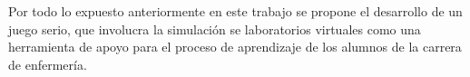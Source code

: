 Por todo lo expuesto anteriormente en este trabajo se propone  el desarrollo de
un juego serio, que involucra la simulación se laboratorios virtuales como una
herramienta de apoyo para el proceso de aprendizaje de los alumnos de la carrera
de enfermería.




